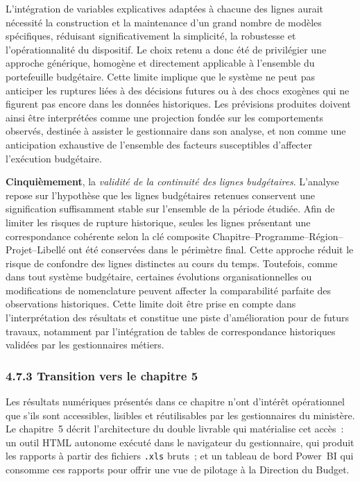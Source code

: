 L'int\'egration de variables explicatives adapt\'ees \`a chacune des
lignes aurait n\'ecessit\'e la construction et la maintenance d'un grand
nombre de mod\`eles sp\'ecifiques, r\'eduisant significativement la
simplicit\'e, la robustesse et l'op\'erationnalit\'e du dispositif. Le
choix retenu a donc \'et\'e de privil\'egier une approche g\'en\'erique,
homog\`ene et directement applicable \`a l'ensemble du portefeuille
budg\'etaire. Cette limite implique que le syst\`eme ne peut pas anticiper
les ruptures li\'ees \`a des d\'ecisions futures ou \`a des chocs exog\`enes
qui ne figurent pas encore dans les donn\'ees historiques. Les pr\'evisions
produites doivent ainsi \^etre interpr\'et\'ees comme une projection
fond\'ee sur les comportements observ\'es, destin\'ee \`a assister le
gestionnaire dans son analyse, et non comme une anticipation exhaustive
de l'ensemble des facteurs susceptibles d'affecter l'ex\'ecution
budg\'etaire.

\textbf{Cinqui\`emement}, la \textit{validit\'e de la continuit\'e des
lignes budg\'etaires}. L'analyse repose sur l'hypoth\`ese que les lignes
budg\'etaires retenues conservent une signification suffisamment stable
sur l'ensemble de la p\'eriode \'etudi\'ee. Afin de limiter les risques
de rupture historique, seules les lignes pr\'esentant une correspondance
coh\'erente selon la cl\'e composite
Chapitre--Programme--R\'egion--Projet--Libell\'e ont \'et\'e conserv\'ees
dans le p\'erim\`etre final. Cette approche r\'eduit le risque de
confondre des lignes distinctes au cours du temps. Toutefois, comme dans
tout syst\`eme budg\'etaire, certaines \'evolutions organisationnelles
ou modifications de nomenclature peuvent affecter la comparabilit\'e
parfaite des observations historiques. Cette limite doit \^etre prise
en compte dans l'interpr\'etation des r\'esultats et constitue une piste
d'am\'elioration pour de futurs travaux, notamment par l'int\'egration
de tables de correspondance historiques valid\'ees par les gestionnaires
m\'etiers.

\subsubsection*{4.7.3 \quad Transition vers le chapitre 5}

Les r\'esultats num\'eriques pr\'esent\'es dans ce chapitre n'ont d'int\'er\^et
op\'erationnel que s'ils sont accessibles, lisibles et r\'eutilisables par les
gestionnaires du minist\`ere. Le chapitre~5 d\'ecrit l'architecture du
double livrable qui mat\'erialise cet acc\`es~: un outil HTML autonome
ex\'ecut\'e dans le navigateur du gestionnaire, qui produit les rapports
\`a partir des fichiers \texttt{.xls} bruts~; et un tableau de bord Power~BI
qui consomme ces rapports pour offrir une vue de pilotage \`a la Direction
du Budget.
